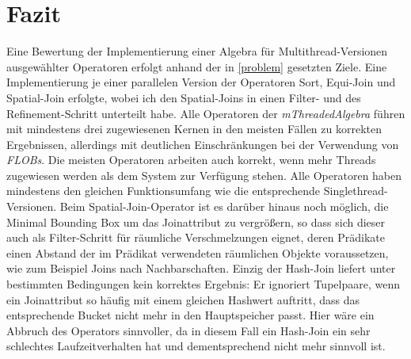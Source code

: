 \documentclass[a4paper,12pt,twoside]{article}
\newcommand{\Fb}[1]{\textit{#1}} %
\begin{document}
\section{Fazit}

Eine Bewertung der Implementierung einer Algebra für Multithread-Versionen ausgewählter Operatoren erfolgt anhand der in \autoref{problem} gesetzten Ziele. Eine Implementierung je einer parallelen Version der Operatoren Sort, Equi-Join und Spatial-Join erfolgte, wobei ich den Spatial-Joins in einen Filter- und des Refinement-Schritt unterteilt habe. Alle Operatoren der \Fb{mThreadedAlgebra} führen mit mindestens drei zugewiesenen Kernen in den meisten Fällen zu korrekten Ergebnissen, allerdings mit deutlichen Einschränkungen bei der Verwendung von \Fb{FLOBs}. Die meisten Operatoren arbeiten auch korrekt, wenn mehr Threads zugewiesen werden als dem System zur Verfügung stehen. Alle Operatoren haben mindestens den gleichen Funktionsumfang wie die entsprechende Singlethread-Versionen. Beim Spatial-Join-Operator ist es darüber hinaus noch möglich, die Minimal Bounding Box um das Joinattribut zu vergrößern, so dass sich dieser auch als Filter-Schritt für räumliche Verschmelzungen eignet, deren Prädikate einen Abstand der im Prädikat verwendeten räumlichen Objekte voraussetzen, wie zum Beispiel Joins nach Nachbarschaften. Einzig der Hash-Join liefert unter bestimmten Bedingungen kein korrektes Ergebnis: Er ignoriert Tupelpaare, wenn ein Joinattribut so häufig mit einem gleichen Hashwert auftritt, dass das entsprechende Bucket nicht mehr in den Hauptspeicher passt. Hier wäre ein Abbruch des Operators sinnvoller, da in diesem Fall ein Hash-Join ein sehr schlechtes Laufzeitverhalten hat und dementsprechend nicht mehr sinnvoll ist.
\end{document}

